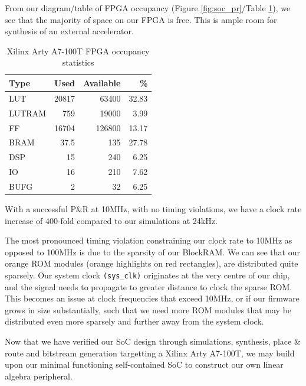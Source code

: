 \documentclass[a4paper,8pt]{report}
\begin{document}
From our diagram/table of FPGA occupancy (Figure \ref{fig:soc_pr}/Table
\ref{table:soc_pr}), we see that the majority of space on our FPGA is
free. This is ample room for synthesis of an external accelerator.
\begin{table}[b]
  \centering
  \begin{tabular}{l|r|r|r}
    \toprule
    Type  & Used & Available & \% \\
    \midrule
    LUT   &	20817&	63400	&32.83 \\
    LUTRAM&	759	 &19000	  &3.99 \\
    FF	  &16704 &126800	&13.17 \\
    BRAM	&37.5	 &135	    &27.78 \\
    DSP	  &15	   &240	    &6.25 \\ 
    IO	  &16	   &210	    &7.62\\ 
    BUFG	&2	   &32	    &6.25\\
    \bottomrule
  \end{tabular}
  \caption{Xilinx Arty A7-100T FPGA occupancy statistics}
  \label{table:soc_pr}
\end{table}

With a successful P\&R at 10MHz, with no timing violations, we have a clock rate
increase of 400-fold compared to our simulations at 24kHz.

The most pronounced timing violation constraining our clock rate to 10MHz as
opposed to 100MHz is due to the sparsity of our BlockRAM. We can see that our
orange ROM modules (orange highlights on red rectangles), are distributed quite
sparsely. Our system clock \texttt{(sys\_clk)} originates at the very centre of
our chip, and the signal needs to propagate to greater distance to clock the
sparse ROM. This becomes an issue at clock frequencies that exceed 10MHz, or if
our firmware grows in size substantially, such that we need more ROM modules
that may be distributed even more sparsely and further away from the system clock.

Now that we have verified our SoC design through simulations, synthesis, place
\& route and bitstream generation targetting a Xilinx Arty A7-100T, we may build
upon our minimal functioning self-contained SoC to construct our own linear
algebra peripheral.
\end{document}
